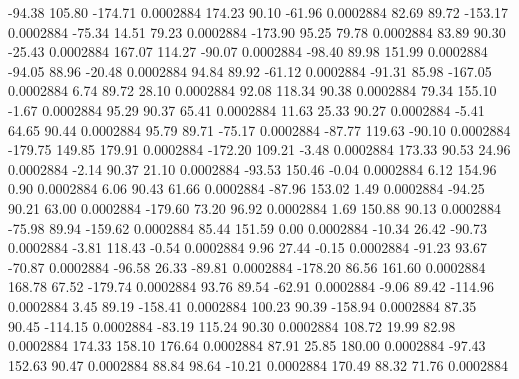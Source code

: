       -94.38      105.80     -174.71     0.0002884
      174.23       90.10      -61.96     0.0002884
       82.69       89.72     -153.17     0.0002884
      -75.34       14.51       79.23     0.0002884
     -173.90       95.25       79.78     0.0002884
       83.89       90.30      -25.43     0.0002884
      167.07      114.27      -90.07     0.0002884
      -98.40       89.98      151.99     0.0002884
      -94.05       88.96      -20.48     0.0002884
       94.84       89.92      -61.12     0.0002884
      -91.31       85.98     -167.05     0.0002884
        6.74       89.72       28.10     0.0002884
       92.08      118.34       90.38     0.0002884
       79.34      155.10       -1.67     0.0002884
       95.29       90.37       65.41     0.0002884
       11.63       25.33       90.27     0.0002884
       -5.41       64.65       90.44     0.0002884
       95.79       89.71      -75.17     0.0002884
      -87.77      119.63      -90.10     0.0002884
     -179.75      149.85      179.91     0.0002884
     -172.20      109.21       -3.48     0.0002884
      173.33       90.53       24.96     0.0002884
       -2.14       90.37       21.10     0.0002884
      -93.53      150.46       -0.04     0.0002884
        6.12      154.96        0.90     0.0002884
        6.06       90.43       61.66     0.0002884
      -87.96      153.02        1.49     0.0002884
      -94.25       90.21       63.00     0.0002884
     -179.60       73.20       96.92     0.0002884
        1.69      150.88       90.13     0.0002884
      -75.98       89.94     -159.62     0.0002884
       85.44      151.59        0.00     0.0002884
      -10.34       26.42      -90.73     0.0002884
       -3.81      118.43       -0.54     0.0002884
        9.96       27.44       -0.15     0.0002884
      -91.23       93.67      -70.87     0.0002884
      -96.58       26.33      -89.81     0.0002884
     -178.20       86.56      161.60     0.0002884
      168.78       67.52     -179.74     0.0002884
       93.76       89.54      -62.91     0.0002884
       -9.06       89.42     -114.96     0.0002884
        3.45       89.19     -158.41     0.0002884
      100.23       90.39     -158.94     0.0002884
       87.35       90.45     -114.15     0.0002884
      -83.19      115.24       90.30     0.0002884
      108.72       19.99       82.98     0.0002884
      174.33      158.10      176.64     0.0002884
       87.91       25.85      180.00     0.0002884
      -97.43      152.63       90.47     0.0002884
       88.84       98.64      -10.21     0.0002884
      170.49       88.32       71.76     0.0002884
